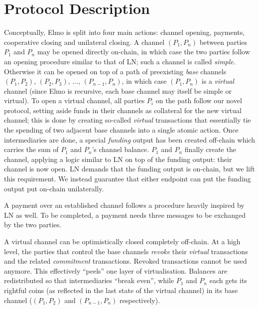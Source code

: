 \section{Protocol Description}
  Conceptually, Elmo is split into four main actions: channel opening,
  payments, cooperative closing and unilateral closing. A channel $(P_1, P_n)$
  between parties $P_1$ and $P_n$
  may be opened directly on-chain, in which case the two parties follow an
  opening procedure similar to that of LN; such a channel is called
  \emph{simple}.
  Otherwise it can be opened on top of a path
  of preexisting \emph{base} channels $(P_1, P_2)$, $(P_2, P_3)$, $\dots$,
  $(P_{n-1}, P_{n})$, in which case $(P_1, P_n)$ is a \emph{virtual}
  channel (since Elmo is recursive, each base channel may itself be simple or
  virtual). To open a virtual
  channel, all parties $P_i$ on the
  path follow our novel protocol, setting aside funds in their channels as
  collateral for the new virtual channel; this is done
  by creating so-called \emph{virtual} transactions that essentially
  tie the spending of two adjacent base channels into a single atomic action.
  Once intermediaries are done, a special \emph{funding} output has been
  created off-chain which carries the sum of $P_1$ and $P_n$'s channel
  balance. $P_1$ and $P_n$
  finally create the channel, applying a logic similar to LN on top of
  the funding output: their channel is now open. LN demands that the funding
  output is on-chain, but we lift this requirement. We instead guarantee that
  either endpoint can put the funding output put on-chain unilaterally.

  A payment over an established channel follows a procedure heavily inspired by
  LN as well. To be completed, a payment needs three messages to be exchanged by
  the two parties.

  A virtual channel can be optimistically closed completely off-chain. At a high
  level, the parties that control the base channels \emph{revoke} their \emph{virtual}
  transactions and the related \emph{commitment} transactions. Revoked transactions
  cannot be used anymore. This effectively ``peels'' one layer of virtualisation.
  Balances are redistributed so that intermediaries ``break even'', while $P_1$
  and $P_n$ each gets its rightful coins (as reflected in the last state of the
  virtual channel) in its base channel ($(P_1, P_2)$ and $(P_{n-1}, P_n)$
  respectively).

